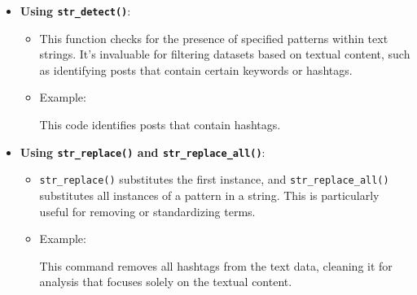 \documentclass[
]{book}
\newenvironment{Shaded}{\begin{snugshade}}{\end{snugshade}}
\newcommand{\FunctionTok}[1]{\textcolor[rgb]{0.13,0.29,0.53}{\textbf{#1}}}
\newcommand{\NormalTok}[1]{#1}
\newcommand{\OtherTok}[1]{\textcolor[rgb]{0.56,0.35,0.01}{#1}}
\newcommand{\SpecialCharTok}[1]{\textcolor[rgb]{0.81,0.36,0.00}{\textbf{#1}}}
\newcommand{\StringTok}[1]{\textcolor[rgb]{0.31,0.60,0.02}{#1}}
\providecommand{\tightlist}{%
  \setlength{\itemsep}{0pt}\setlength{\parskip}{0pt}}
\begin{document}
\begin{itemize}
\tightlist
\item
  \textbf{Using \texttt{str\_detect()}}:

  \begin{itemize}
  \item
    This function checks for the presence of specified patterns within text strings. It's invaluable for filtering datasets based on textual content, such as identifying posts that contain certain keywords or hashtags.
  \item
    Example:

\begin{Shaded}
\end{Shaded}

    This code identifies posts that contain hashtags.
  \end{itemize}
\item
  \textbf{Using \texttt{str\_replace()} and \texttt{str\_replace\_all()}}:

  \begin{itemize}
  \item
    \texttt{str\_replace()} substitutes the first instance, and \texttt{str\_replace\_all()} substitutes all instances of a pattern in a string. This is particularly useful for removing or standardizing terms.
  \item
    Example:

\begin{Shaded}
\end{Shaded}

    This command removes all hashtags from the text data, cleaning it for analysis that focuses solely on the textual content.
  \end{itemize}
\end{itemize}
\end{document}
